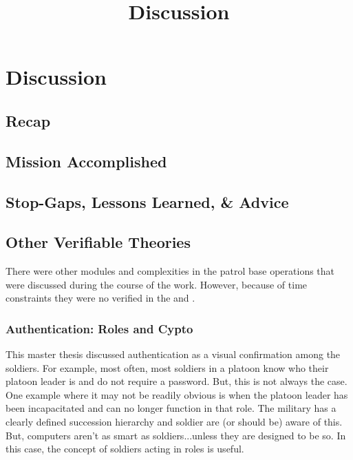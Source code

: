 \documentclass[../../main/main.tex]{subfiles}
\begin{document}
\title{Discussion}

\chapter{Discussion}\label{chp:discussion}

\section{Recap}\label{recap}

\section{Mission Accomplished}\label{missionaccomplished}

\section{Stop-Gaps, Lessons Learned, \& Advice}\label{stopgap}

\section{Other Verifiable Theories}\label{otherTheories}
There were other modules and complexities in the patrol base operations that were discussed during the course of the work.  However, because of time constraints they were no verified in the  and .

\subsection{Authentication: Roles and Cypto}
This master thesis discussed authentication as a visual confirmation among the soldiers. For example, most often, most soldiers in a platoon know who their platoon leader is and do not require a password.  But, this is not always the case.  One example where it may not be readily obvious is when the platoon leader has been incapacitated and can no longer function in that role.  The military has a clearly defined succession hierarchy and soldier are (or should be) aware of this.  But, computers aren't as smart as soldiers...unless they are designed to be so.  In this case, the concept of soldiers acting in roles is useful.
\end{document}
